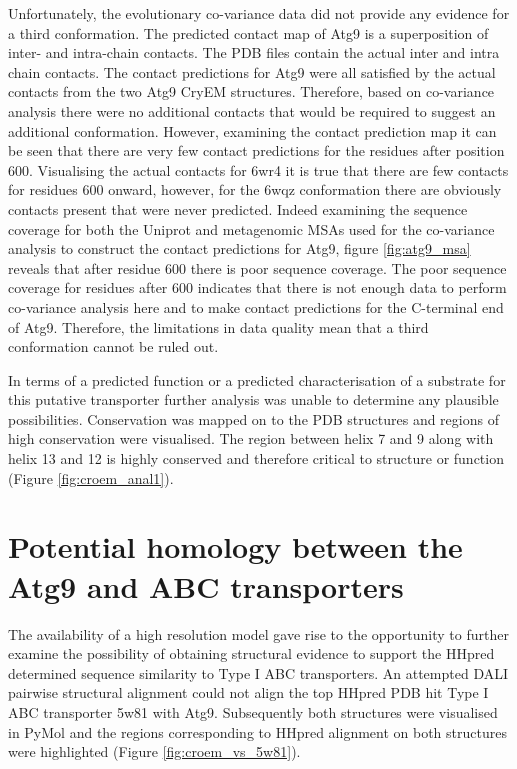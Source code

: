 Unfortunately, the evolutionary co-variance data did not provide any evidence for a third conformation. The predicted contact map of Atg9 is a superposition of inter- and intra-chain contacts. The PDB files contain the actual inter and intra chain contacts. The contact predictions for Atg9 were all satisfied by the actual contacts from the two Atg9 CryEM structures. Therefore, based on co-variance analysis there were no additional contacts that would be required to suggest an additional conformation.  However, examining the contact prediction map it can be seen that there are very few contact predictions for the residues after position 600. Visualising the actual contacts for 6wr4 it is true that there are few contacts for residues 600 onward, however, for the 6wqz conformation there are obviously contacts present that were never predicted.  Indeed examining the sequence coverage for both the Uniprot and metagenomic MSAs used for the co-variance analysis to construct the contact predictions for Atg9, figure \ref{fig:atg9_msa} reveals that after residue 600 there is poor sequence coverage.  The poor sequence coverage for residues after 600 indicates that there is not enough data to perform co-variance analysis here and to make contact predictions for the C-terminal end of Atg9. Therefore, the limitations in data quality mean that a third conformation cannot be ruled out.

In terms of a predicted function or a predicted characterisation of a substrate for this putative transporter further analysis was unable to determine any plausible possibilities. Conservation was mapped on to the PDB structures and regions of high conservation were visualised. The region between helix 7 and 9 along with helix 13 and 12 is highly conserved and therefore critical to structure or function (Figure \ref{fig:croem_anal1}). 

\section{Potential homology between the Atg9 and ABC transporters}

 The availability of a high resolution model gave rise to the opportunity to further examine the possibility of obtaining structural evidence to support the HHpred determined sequence similarity to Type I ABC transporters.  An attempted DALI pairwise structural alignment could not align the top HHpred PDB hit Type I ABC transporter 5w81 with Atg9.  Subsequently both structures were visualised in PyMol and the regions corresponding to HHpred alignment on both structures were highlighted (Figure \ref{fig:croem_vs_5w81}).


